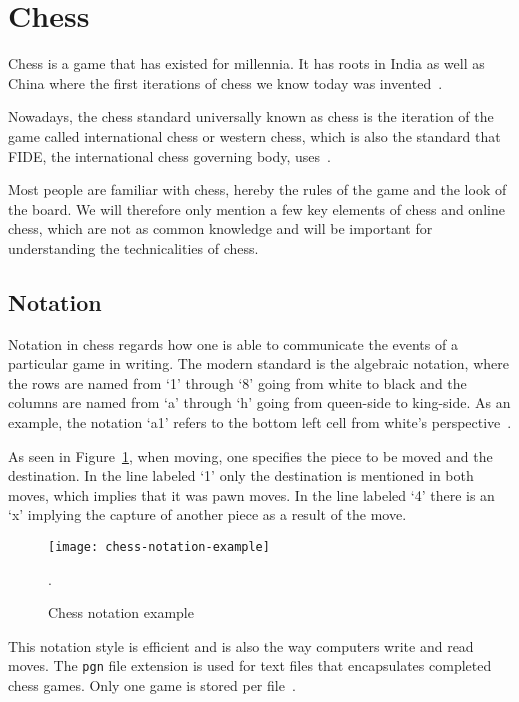 \section{Chess}\label{sec:chess}

Chess is a game that has existed for millennia.
It has roots in India as well as China where the first iterations of chess we know today was invented~\cite{murray1913}.

Nowadays, the chess standard universally known as chess is the iteration of the game called international chess or
western chess, which is also the standard that FIDE, the international chess governing body, uses~\cite{fide2024}.

Most people are familiar with chess, hereby the rules of the game and the look of the board.
We will therefore only mention a few key elements of chess and online chess, which are not as common knowledge and will
be important for understanding the technicalities of chess.

\subsection{Notation}\label{subsec:notation}

Notation in chess regards how one is able to communicate the events of a particular game in writing.
The modern standard is the algebraic notation, where the rows are named from `1' through `8' going from white to black
and the columns are named from `a' through `h' going from queen-side to king-side.
As an example, the notation `a1' refers to the bottom left cell from white's perspective~\cite{pickel2022}.

As seen in Figure~\ref{fig:chess-notation-example}, when moving, one specifies the piece to be moved and the
destination.
In the line labeled `1' only the destination is mentioned in both moves, which implies that it was pawn moves.
In the line labeled `4' there is an `x' implying the capture of another piece as a result of the move.

\begin{figure}[h]
    \centering
    \texttt{[image: chess-notation-example]}
    \caption{Chess notation example~\cite{chess.com2024}}.\label{fig:chess-notation-example}
\end{figure}

This notation style is efficient and is also the way computers write and read moves.
The \lstinline{pgn} file extension is used for text files that encapsulates completed chess games.
Only one game is stored per file~\cite{chess.com2024}.

